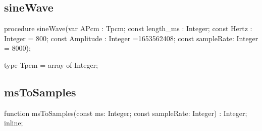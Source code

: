 \documentclass{report}
\newif\ifpdf
\begin{document}
\subsection*{sineWave}
\fi
\label{morse.pcm.sine-sineWave}
\begin{list}{}{
\setlength{\itemindent}{0cm}
\setlength{\listparindent}{0cm}
\setlength{\leftmargin}{\evensidemargin}
\addtolength{\leftmargin}{\tmplength}
\settowidth{\labelsep}{X}
\addtolength{\leftmargin}{\labelsep}
\setlength{\labelwidth}{\tmplength}
}
\item[\textbf{Declaration}\hfill]
\ifpdf
\begin{flushleft}
\fi
\begin{ttfamily}
procedure sineWave(var APcm : Tpcm; const length{\_}ms : Integer; const Hertz : Integer = 800; const Amplitude : Integer =1653562408; const sampleRate: Integer = 8000);\end{ttfamily}

\ifpdf
\end{flushleft}
\fi

\par
\item[\textbf{Description}]
type Tpcm = array of Integer;

\end{list}
\ifpdf
\subsection*{\large{\textbf{msToSamples}}\normalsize\hspace{1ex}\hrulefill}
\else
\subsection*{msToSamples}
\fi
\label{morse.pcm.sine-msToSamples}
\begin{list}{}{
\setlength{\itemindent}{0cm}
\setlength{\listparindent}{0cm}
\setlength{\leftmargin}{\evensidemargin}
\addtolength{\leftmargin}{\tmplength}
\settowidth{\labelsep}{X}
\addtolength{\leftmargin}{\labelsep}
\setlength{\labelwidth}{\tmplength}
}
\item[\textbf{Declaration}\hfill]
\ifpdf
\begin{flushleft}
\fi
\begin{ttfamily}
function msToSamples(const ms: Integer; const sampleRate: Integer) : Integer; inline;\end{ttfamily}

\ifpdf
\end{flushleft}
\fi

\end{list}
\end{document}
